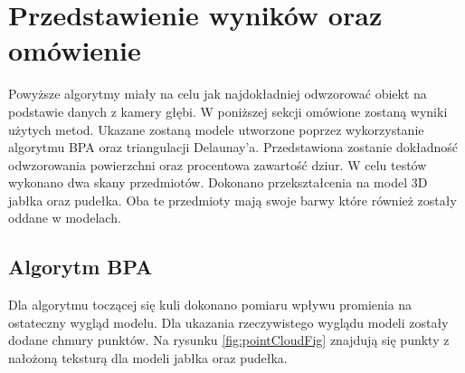 \section{Przedstawienie wyników oraz omówienie}
Powyższe algorytmy miały na celu jak najdokładniej odwzorować obiekt na podstawie danych z kamery głębi. W poniższej sekcji omówione zostaną wyniki użytych metod. Ukazane zostaną modele utworzone poprzez wykorzystanie algorytmu BPA oraz triangulacji Delaunay'a. Przedstawiona zostanie dokładność odwzorowania powierzchni oraz procentowa zawartość dziur. W celu testów wykonano dwa skany przedmiotów. Dokonano przekształcenia na model 3D jabłka oraz pudełka. Oba te przedmioty mają swoje barwy które również zostały oddane w modelach.
\subsection{Algorytm BPA}
Dla algorytmu toczącej się kuli dokonano pomiaru wpływu promienia na ostateczny wygląd modelu. Dla ukazania rzeczywistego wyglądu modeli zostały dodane chmury punktów. Na rysunku \ref{fig:pointCloudFig} znajdują się punkty z nałożoną teksturą dla modeli jabłka oraz pudełka.
